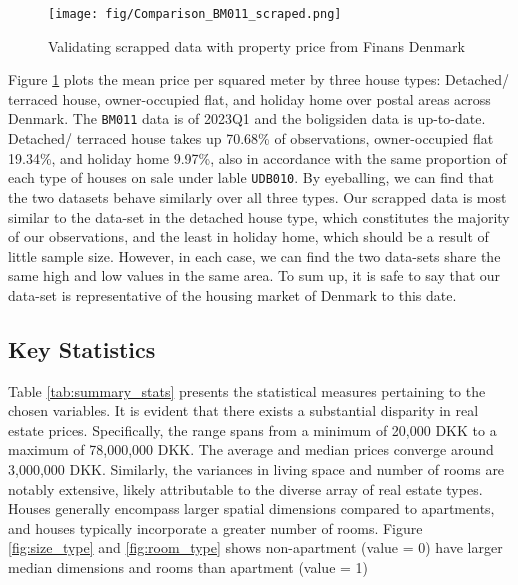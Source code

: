 \documentclass[12pt]{article} %
\begin{document}
{            \begin{figure}[]
                \centering
                \texttt{[image: fig/Comparison\_BM011\_scraped.png]}
                \caption{Validating scrapped data with property price from Finans Denmark}
                \label{fig:compar}
            \end{figure}    

        Figure \ref{fig:compar} plots the mean price per squared meter by three house types: Detached/ terraced house, owner-occupied flat, and holiday home over postal areas across Denmark. The \texttt{BM011} data is of 2023Q1 and the boligsiden data is up-to-date. Detached/ terraced house takes up 70.68\% of observations, owner-occupied flat 19.34\%, and holiday home 9.97\%, also in accordance with the same proportion of each type of houses on sale under lable \texttt{UDB010}. By eyeballing, we can find that the two datasets behave similarly over all three types. Our scrapped data is most similar to the data-set in the detached house type, which constitutes the majority of our observations, and the least in holiday home, which should be a result of little sample size. However, in each case, we can find the two data-sets share the same high and low values in the same area. To sum up, it is safe to say that our data-set is representative of the housing market of Denmark to this date.

        
            

    \subsection{Key Statistics}
        Table \ref{tab:summary_stats} presents the statistical measures pertaining to the chosen variables. It is evident that there exists a substantial disparity in real estate prices. Specifically, the range spans from a minimum of 20,000 DKK to a maximum of 78,000,000 DKK. The average and median prices converge around 3,000,000 DKK. Similarly, the variances in living space and number of rooms are notably extensive, likely attributable to the diverse array of real estate types. Houses generally encompass larger spatial dimensions compared to apartments, and houses typically incorporate a greater number of rooms. Figure \ref{fig:size_type} and \ref{fig:room_type} shows non-apartment (value = 0) have larger median dimensions and rooms than apartment (value = 1)

}
\end{document}
